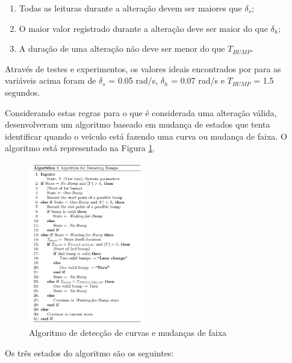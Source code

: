 \begin{enumerate}
  \item Todas as leituras durante a alteração devem ser maiores que $\delta_{s}$;
  \item O maior valor registrado durante a alteração deve ser maior do que $\delta_{h}$;
  \item A duração de uma alteração não deve ser menor do que $T_{BUMP}$.
\end{enumerate}

Através de testes e experimentos, os valores ideais encontrados por  para as variáveis acima foram de $\delta_{s}$ = 0.05 rad/s,
$\delta_{h}$ = 0.07 rad/s e $T_{BUMP}$ = 1.5 segundos.

Considerando estas regras para o que é considerada uma alteração válida,  desenvolveram um algoritmo baseado em mudança de estados
que tenta identificar quando o veículo está fazendo uma curva ou mudança de faixa. O algoritmo está representado na Figura \ref{algoritmo-giroscopio}.

\begin{figure}[h]
  \centering
  \includegraphics[width=0.45\textwidth]{images/algoritmo-giroscopio.png}
  \caption{Algoritmo de detecção de curvas e mudanças de faixa \cite{chen2015invisible}}
  \label{algoritmo-giroscopio}
\end{figure}

Os três estados do algoritmo são os seguintes:

